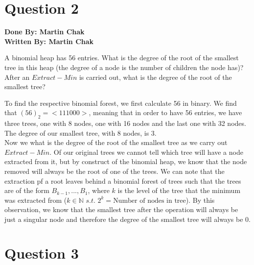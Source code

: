 \documentclass[20pt]{article}
\begin{document}

\newpage

\section*{Question 2}

\textbf{Done By: Martin Chak}\\
\textbf{Written By: Martin Chak}\\

\noindent
\begin{text}
    A binomial heap has 56 entries. What is the degree of the root of the smallest tree in this heap (the degree of a node is the number of children the node has)? After an $Extract-Min$ is carried out, what is the degree of the root of the smallest tree?\\
\end{text}

\noindent
\begin{text}
    To find the respective binomial forest, we first calculate 56 in binary. We find that $(56)_2 = <111000>$, meaning that in order to have 56 entries, we have three trees, one with 8 nodes, one with 16 nodes and the last one with 32 nodes. The degree of our smallest tree, with 8 nodes, is 3.\\
    
    \noindent
    Now we what is the degree of the root of the smallest tree as we carry out $Extract-Min$. Of our original trees we cannot tell which tree will have a node extracted from it, but by construct of the binomial heap, we know that the node removed will always be the root of one of the trees. We can note that the extraction pf a root leaves behind a binomial forest of trees such that the trees are of the form $B_{k-1}, ..., B_{1}$, where $k$ is the level of the tree that the minimum was extracted from ($k \in \mathbb{N} \, \, s.t. \, \, 2^k = \text{Number of nodes in tree}$). By this observation, we know that the smallest tree after the operation will always be just a singular node and therefore the degree of the smallest tree will always be 0.
\end{text}


\newpage

\section*{Question 3}
\end{document}
